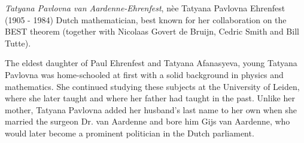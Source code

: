 \documentclass[12pt]{article}
\begin{document}
\emph{Tatyana Pavlovna van Aardenne-Ehrenfest}, n\`ee {Tatyana Pavlovna Ehrenfest} (1905 - 1984) Dutch mathematician, best known for her collaboration on the BEST theorem (together with Nicolaas Govert de Bruijn, Cedric Smith and Bill Tutte).

The eldest daughter of Paul Ehrenfest and Tatyana Afanasyeva, young Tatyana Pavlovna was home-schooled at first with a solid background in physics and mathematics. She continued studying these subjects at the University of Leiden, where she later taught and where her father had taught in the past. Unlike her mother, Tatyana Pavlovna added her husband's last name to her own when she married the surgeon Dr. van Aardenne and bore him Gijs van Aardenne, who would later become a prominent politician in the Dutch parliament.
\end{document}
